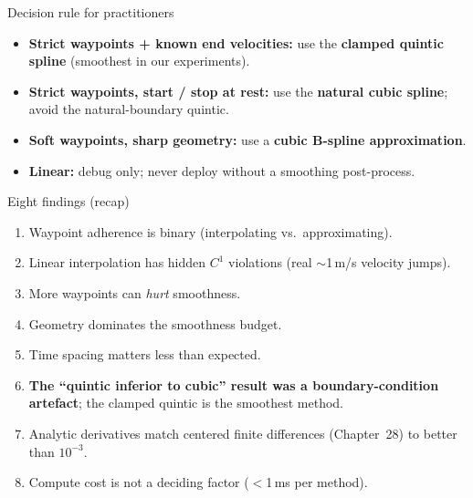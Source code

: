 \documentclass[aspectratio=169]{beamer}
\newcommand{\highlight}[1]{\textcolor{red!70!black}{\textbf{#1}}}
\begin{document}
\begin{frame}{Decision rule for practitioners}
\begin{itemize}
    \item \textbf{Strict waypoints + known end velocities:}
          use the \highlight{clamped quintic spline} (smoothest in
          our experiments).
    \item \textbf{Strict waypoints, start / stop at rest:}
          use the \highlight{natural cubic spline}; avoid the
          natural-boundary quintic.
    \item \textbf{Soft waypoints, sharp geometry:}
          use a \highlight{cubic B-spline approximation}.
    \item \textbf{Linear:} debug only; never deploy without a
          smoothing post-process.
\end{itemize}
\end{frame}

\begin{frame}{Eight findings (recap)}
\footnotesize
\begin{enumerate}
    \item Waypoint adherence is binary (interpolating vs.\
          approximating).
    \item Linear interpolation has hidden $C^1$ violations
          (real $\sim$1\,m/s velocity jumps).
    \item More waypoints can \emph{hurt} smoothness.
    \item Geometry dominates the smoothness budget.
    \item Time spacing matters less than expected.
    \item \highlight{The ``quintic inferior to cubic'' result was a
          boundary-condition artefact}; the clamped quintic is the
          smoothest method.
    \item Analytic derivatives match centered finite differences
          (Chapter~28) to better than $10^{-3}$.
    \item Compute cost is not a deciding factor ($<$1\,ms per method).
\end{enumerate}
\end{frame}
\end{document}

